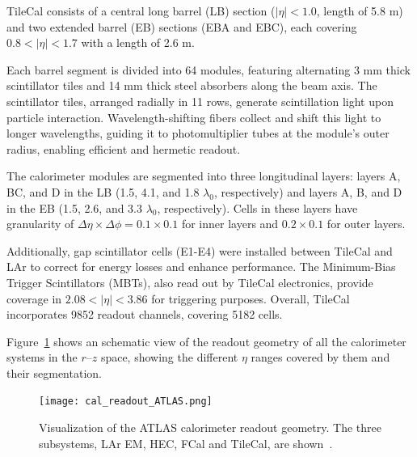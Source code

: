 TileCal consists of a central long barrel (LB) section ($|\eta|<1.0$, length of 5.8 m) and two extended barrel (EB) sections (EBA and EBC), each covering $0.8<|\eta|<1.7$ with a length of 2.6 m.

Each barrel segment is divided into 64 modules, featuring alternating 3 mm thick scintillator tiles and 14 mm thick steel absorbers along the beam axis. The scintillator tiles, arranged radially in 11 rows, generate scintillation light upon particle interaction. Wavelength-shifting fibers collect and shift this light to longer wavelengths, guiding it to photomultiplier tubes at the module's outer radius, enabling efficient and hermetic readout.

The calorimeter modules are segmented into three longitudinal layers: layers A, BC, and D in the LB (1.5, 4.1, and 1.8 $\lambda_0$, respectively) and layers A, B, and D in the EB (1.5, 2.6, and 3.3 $\lambda_0$, respectively). Cells in these layers have granularity of $\Delta\eta \times \Delta\phi=0.1\times0.1$ for inner layers and $0.2\times0.1$ for outer layers.

Additionally, gap scintillator cells (E1-E4) were installed between TileCal and LAr to correct for energy losses and enhance performance. The Minimum-Bias Trigger Scintillators (MBTs), also read out by TileCal electronics, provide coverage in $2.08<|\eta|<3.86$ for triggering purposes. Overall, TileCal incorporates 9852 readout channels, covering 5182 cells.

Figure~\ref{fig:cal_resum} shows an schematic view of the readout geometry of all the calorimeter systems in the $r$--$z$ space, showing the different $\eta$ ranges covered by them and their segmentation.
\begin{figure}[htbp]
    \centering
        \texttt{[image: cal\_readout\_ATLAS.png]}
    \caption{Visualization of the ATLAS calorimeter readout geometry. The three subsystems, LAr EM, HEC, FCal and TileCal, are shown~\cite{Gessinger:2752944}.}
    \label{fig:cal_resum}
\end{figure}



